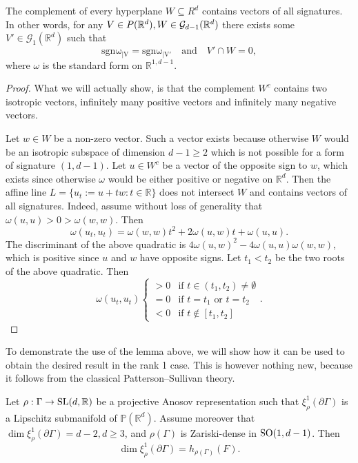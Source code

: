 \documentclass{report}
\begin{document}
\begin{lemma}\label{lem:transverse_subspace}
    The complement of every hyperplane $W \subseteq R^d$ contains vectors of all signatures.
    In other words, for any $V \in \mathcal \mathbb P(\mathbb R^d), W \in \mathcal G_{d-1}(\mathbb R^d)$ there exists some $V' \in \mathcal G_1(\mathbb R^d)$ such that
    \[
    \mathrm{sgn \omega_{|V}} = \mathrm{sgn \omega_{|V'}} \quad \text{and} \quad V' \cap W = 0,
    \]
    where $\omega$ is the standard form on $\mathbb R^{1,d-1}$.    
\end{lemma}
\begin{proof}
    What we will actually show, is that the complement $W^c$ contains two isotropic vectors, infinitely many positive vectors and infinitely many negative vectors.

    Let $w \in W$ be a non-zero vector.
    Such a vector exists because otherwise $W$ would be an isotropic subspace of dimension $d-1 \geq 2$ which is not possible for a form of signature $(1, d-1)$.
    Let $u \in W^c$ be a vector of the opposite sign to $w$, which exists since otherwise $\omega$ would be either positive or negative on $\mathbb R^d$.
    Then the affine line $L = \{ u_t := u + tw : t \in \mathbb R \}$ does not intersect $W$ and contains vectors of all signatures.
    Indeed, assume without loss of generality that $\omega(u,u) > 0 > \omega(w,w)$.
    Then
    \[
    \omega(u_t, u_t) = \omega(w,w) t^2 + 2\omega(u, w) t + \omega(u,u).
    \]
    The discriminant of the above quadratic is $4\omega(u,w)^2 - 4\omega(u,u)\omega(w,w)$, which is positive since $u$ and $w$ have opposite signs.
    Let $t_1 < t_2$ be the two roots of the above quadratic.
    Then
    \begin{equation}\label{eq:affine_line}
    \omega(u_t, u_t)
    \begin{cases}
        > 0 & \text{if } t \in (t_1, t_2) \neq \emptyset \\
        = 0 & \text{if } t = t_1 \text{ or } t = t_2 \\
        < 0 & \text{if } t \notin [t_1, t_2]
    \end{cases}.    
    \end{equation}
\end{proof}
To demonstrate the use of the lemma above, we will show how it can be used to obtain the desired result in the rank 1 case.
This is however nothing new, because it follows from the classical Patterson--Sullivan theory.
\begin{lemma}\label{lem:SO_1_d-1}
    Let $\rho: \Gamma \to \operatorname{{\mathrm{SL}}}(d, \mathbb R)$ be a projective Anosov representation such that $\xi^1_\rho(\partial \Gamma)$ is a Lipschitz submanifold of $\mathbb P(\mathbb R^d)$.
    Assume moreover that $\dim \xi_\rho^1(\partial \Gamma) = d - 2, d \geq 3$, and $\rho(\Gamma)$ is Zariski-dense in $\operatorname{{\mathrm{SO}}}(1,d-1)$. Then
    \[
        \dim \xi_\rho^1(\partial \Gamma) = h_{\rho(\Gamma)}(F).
    \]
\end{lemma}
\end{document}
